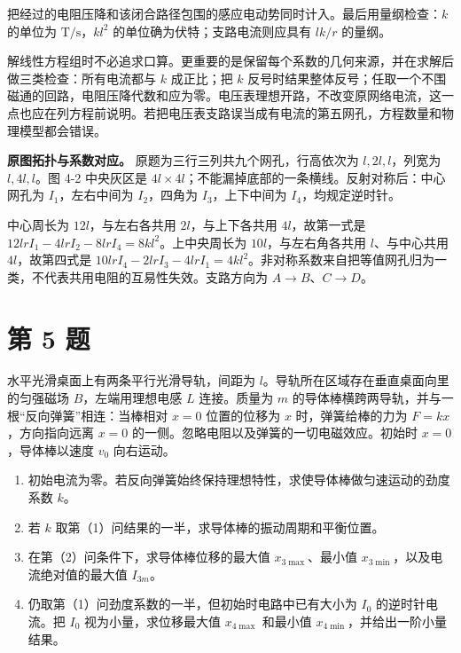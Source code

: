 \documentclass[12pt,a4paper,UTF8]{ctexart}
\newcommand{\tightlist}{\setlength{\itemsep}{0pt}\setlength{\parskip}{0pt}}
\begin{document}
把经过的电阻压降和该闭合路径包围的感应电动势同时计入。最后用量纲检查：\(k\)
的单位为 \(\mathrm{T/s}\)，\(kl^2\) 的单位确为伏特；支路电流则应具有
\(lk/r\) 的量纲。

解线性方程组时不必追求口算。更重要的是保留每个系数的几何来源，并在求解后做三类检查：所有电流都与
\(k\) 成正比；把 \(k\)
反号时结果整体反号；任取一个不围磁通的回路，电阻压降代数和应为零。电压表理想开路，不改变原网络电流，这一点也应在列方程前说明。若把电压表支路误当成有电流的第五网孔，方程数量和物理模型都会错误。

\textbf{原图拓扑与系数对应。} 原题为三行三列共九个网孔，行高依次为
\(l,2l,l\)，列宽为 \(l,4l,l\)。图 4-2 中央灰区是
\(4l\times4l\)；不能漏掉底部的一条横线。反射对称后：中心网孔为
\(I_1\)，左右中间为 \(I_2\)，四角为 \(I_3\)，上下中间为
\(I_4\)，均规定逆时针。

中心周长为 \(12l\)，与左右各共用 \(2l\)，与上下各共用 \(4l\)，故第一式是
\(12lrI_1-4lrI_2-8lrI_4=8kl^2\)。上中央周长为 \(10l\)，与左右角各共用
\(l\)、与中心共用 \(4l\)，故第四式是
\(10lrI_4-2lrI_3-4lrI_1=4kl^2\)。非对称系数来自把等值网孔归为一类，不代表共用电阻的互易性失效。支路方向为
\(A\to B\)、\(C\to D\)。

\newpage

\section{第 5 题}\label{ux7b2c-5-ux9898}

水平光滑桌面上有两条平行光滑导轨，间距为
\(l\)。导轨所在区域存在垂直桌面向里的匀强磁场 \(B\)，左端用理想电感
\(L\) 连接。质量为 \(m\)
的导体棒横跨两导轨，并与一根``反向弹簧''相连：当棒相对 \(x=0\)
位置的位移为 \(x\) 时，弹簧给棒的力为 \(F=kx\)，方向指向远离 \(x=0\)
的一侧。忽略电阻以及弹簧的一切电磁效应。初始时 \(x=0\)，导体棒以速度
\(v_0\) 向右运动。

\begin{enumerate}
\def\labelenumi{\arabic{enumi}.}
\tightlist
\item
  初始电流为零。若反向弹簧始终保持理想特性，求使导体棒做匀速运动的劲度系数
  \(k\)。
\item
  若 \(k\) 取第（1）问结果的一半，求导体棒的振动周期和平衡位置。
\item
  在第（2）问条件下，求导体棒位移的最大值 \(x_{3\max}\)、最小值
  \(x_{3\min}\)，以及电流绝对值的最大值 \(I_{3m}\)。
\item
  仍取第（1）问劲度系数的一半，但初始时电路中已有大小为 \(I_0\)
  的逆时针电流。把 \(I_0\) 视为小量，求位移最大值 \(x_{4\max}\) 和最小值
  \(x_{4\min}\)，并给出一阶小量结果。
\end{enumerate}
\end{document}

